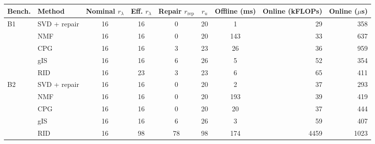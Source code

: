 \begin{tabular}{@{}llcccccrr@{}}
\toprule
Bench. & Method & Nominal $r_\lambda$ & Eff. $r_\lambda$ & Repair $r_{\mathrm{rep}}$ & $r_u$ & Offline (ms) & Online (kFLOPs) & Online ($\mu$s) \\
\midrule
B1 & SVD + repair & 16 & 16 & 0 & 20 & 1 & 29 & 358 \\
 & NMF & 16 & 16 & 0 & 20 & 143 & 33 & 637 \\
 & CPG & 16 & 16 & 3 & 23 & 26 & 36 & 959 \\
 & gIS & 16 & 16 & 6 & 26 & 5 & 52 & 354 \\
 & RID & 16 & 23 & 3 & 23 & 6 & 65 & 411 \\
\midrule
B2 & SVD + repair & 16 & 16 & 0 & 20 & 2 & 37 & 293 \\
 & NMF & 16 & 16 & 0 & 20 & 193 & 39 & 419 \\
 & CPG & 16 & 16 & 0 & 20 & 20 & 37 & 444 \\
 & gIS & 16 & 16 & 6 & 26 & 3 & 59 & 407 \\
 & RID & 16 & 98 & 78 & 98 & 174 & 4459 & 1023 \\
\bottomrule
\end{tabular}
